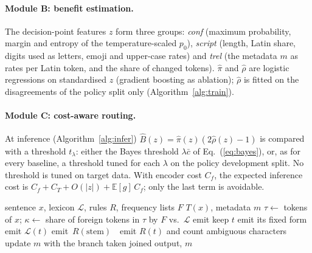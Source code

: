 \paragraph{Module B: benefit estimation.}
The decision-point features $z$ form three groups: \emph{conf} (maximum probability, margin and entropy of the temperature-scaled $p_0$), \emph{script} (length, Latin share, digits used as letters, emoji and upper-case rates) and \emph{trel} (the metadata $m$ as rates per Latin token, and the share of changed tokens). $\hat\pi$ and $\hat\rho$ are logistic regressions on standardised $z$ (gradient boosting as ablation); $\hat\rho$ is fitted on the disagreements of the policy split only (Algorithm~\ref{alg:train}).

\paragraph{Module C: cost-aware routing.}
At inference (Algorithm~\ref{alg:infer}) $\hat B(z)=\hat\pi(z)(2\hat\rho(z)-1)$ is compared with a threshold $t_\lambda$: either the Bayes threshold $\lambda\bar c$ of Eq.~(\ref{eq:bayes}), or, as for every baseline, a threshold tuned for each $\lambda$ on the policy development split. No threshold is tuned on target data. With encoder cost $C_f$, the expected inference cost is $C_f+C_T+O(|z|)+\mathbb E[g]\,C_f$; only the last term is avoidable.

\begin{algorithm}[t]
\small
\caption{Conservative normalisation $\Tcons$}
\label{alg:norm}
\begin{algorithmic}[1]
\Require sentence $x$, lexicon $\mathcal L$, rules $R$, frequency lists $F$
\Ensure $T(x)$, metadata $m$
\State $\tau\gets$ tokens of $x$; $\kappa\gets$ share of foreign tokens in $\tau$ by $F$ vs.\ $\mathcal L$
   emit 
   keep $t$
   emit its fixed form
   emit $\mathcal L(t)$
   emit \,$R(\text{stem})$\,
  \Else\ emit $R(t)$ and count ambiguous characters
  \EndIf
  \State update $m$ with the branch taken
\EndFor
\State \Return joined output, $m$
\end{algorithmic}
\end{algorithm}

